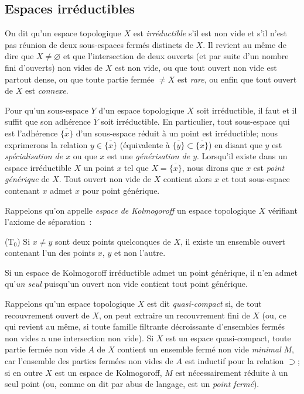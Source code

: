 \subsection{Espaces irréductibles}
\label{subsection:0.2.1-fr}

\begin{env}[2.1.1]
\label{0.2.1.1-fr}
On dit qu'un espace topologique $X$ est \emph{irréductible} s'il est non vide
et s'il n'est pas réunion de deux sous-espaces fermés distincts de $X$. Il
revient au même de dire que $X\neq\varnothing$ et que l'intersection de deux
ouverts (et par suite d'un nombre fini d'ouverts) non vides de $X$ est non
vide, ou que tout ouvert non vide est partout dense, ou que toute partie
fermée $\neq X$ est \emph{rare}, ou enfin que tout ouvert de $X$ est
\emph{connexe}.
\end{env}

\begin{env}[2.1.2]
\label{0.2.1.2-fr}
Pour qu'un sous-espace $Y$ d'un espace topologique $X$ soit irréductible, il
faut et il suffit que son adhérence $\overline Y$ soit irréductible. En
particulier, tout sous-espace qui est l'adhérence $\overline{\{x\}}$ d'un
sous-espace réduit à un point est irréductible; nous exprimerons la relation
$y\in\overline{\{x\}}$ (équivalente à
$\overline{\{y\}}\subset\overline{\{x\}}$) en disant que $y$ est
\emph{spécialisation de $x$} ou que $x$ est une \emph{générisation de $y$}.
Lorsqu'il existe dans un espace irréductible $X$ un point $x$ tel que
$X=\overline{\{x\}}$, nous dirons que $x$ est \emph{point générique} de $X$.
Tout ouvert non vide de $X$ contient alors $x$ et tout sous-espace contenant
$x$ admet $x$ pour point générique.
\end{env}

\begin{env}[2.1.3]
\label{0.2.1.3-fr}
Rappelons qu'on appelle \emph{espace de Kolmogoroff} un espace topologique $X$
vérifiant l'axiome de séparation~:

\smallskip
\noindent
\textup{(T$_0$)} Si $x\neq y$ sont deux points quelconques de $X$, il existe
un ensemble ouvert contenant l'un des points $x$, $y$ et non l'autre.

Si un espace de Kolmogoroff irréductible admet un point générique, il n'en
admet qu'\emph{un seul} puisqu'un ouvert non vide contient tout point
générique.

Rappelons qu'un espace topologique $X$ est dit \emph{quasi-compact} si, de tout
recouvrement ouvert de $X$, on peut extraire un recouvrement fini de $X$ (ou,
ce qui revient au même, si toute famille filtrante décroissante d'ensembles
fermés non vides a une intersection non vide). Si $X$ est un espace
quasi-compact, toute partie fermée non vide $A$ de $X$ contient un ensemble
fermé non vide \emph{minimal} $M$, car l'ensemble des parties fermées non vides
de $A$ est inductif pour la relation $\supset$; si en outre $X$ est un espace
de Kolmogoroff, $M$ est nécessairement réduite à un seul point (ou, comme on
dit par abus de langage, est un \emph{point fermé}).
\end{env}

